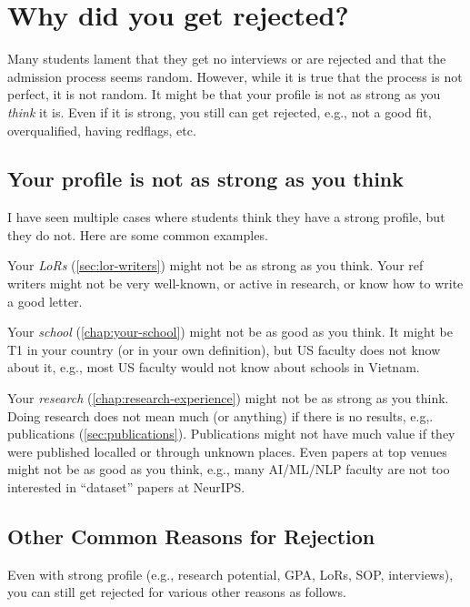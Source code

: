 \documentclass[oneside,11pt,dvipsnames]{book}
\newcommand{\subsectioninfo}[1]{%
  \phantomsection
  \addcontentsline{toc}{subsectioninfo}{\textcolor{black}{\texttt #1}}%
}
\begin{document}
\section{Why did you get rejected?}\label{sec:why-rejected}
\subsectioninfo{You aim too high, are overqualified, or even because you applied to AI/ML, a super competitive field in recent years with many applicants.}

Many students lament that they get no interviews or are rejected and that the admission process seems random.  However, while it is true that the process is not perfect, it is not random.
It might be that your profile is not as strong as you \emph{think} it is.  Even if it is strong, you still can get rejected, e.g., not a good fit, overqualified, having redflags, etc. 


\subsection{Your profile is not as strong as you think}  
I have seen multiple cases where students think they have a strong profile, but they do not. Here are some common examples.

Your \emph{LoRs} (\autoref{sec:lor-writers}) might not be as strong as you think. Your ref writers might not be very well-known, or active in research, or know how to write a good letter. 

Your \emph{school} (\autoref{chap:your-school}) might not be as good as you think.  It might be T1 in your country (or in your own definition), but US faculty does not know about it, e.g., most US faculty would not know about schools in Vietnam.  

Your \emph{research} (\autoref{chap:research-experience}) might not be as strong as you think.  Doing research does not mean much (or anything) if there is no results, e.g,. publications (\autoref{sec:publications}). Publications might not have much value if they were published localled or through unknown places.  Even papers at top venues might not be as good as you think, e.g., many AI/ML/NLP faculty are not too interested in ``dataset'' papers at NeurIPS.

\subsection{Other Common Reasons for Rejection}
Even with strong profile (e.g., research potential, GPA, LoRs, SOP, interviews), you can still get rejected for various other reasons as follows. 
\end{document}
